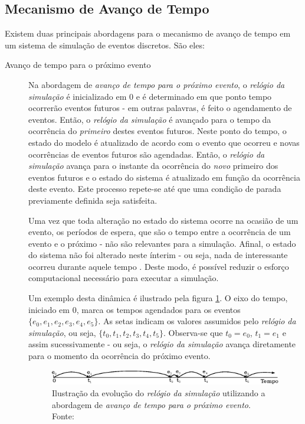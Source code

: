 \subsection{\label{chap:sim:timeadvance}Mecanismo de Avanço de Tempo}

Existem duas principais abordagens para o mecanismo de avanço de tempo em um sistema de simulação de eventos discretos. São eles:

\begin{description}
\item[Avanço de tempo para o próximo evento] \hfill

Na abordagem de \textit{avanço de tempo para o próximo evento}, o
\textit{relógio da simulação} é inicializado em 0 e é determinado em que ponto
tempo ocorrerão eventos futuros - em outras palavras, é feito o agendamento de
eventos. Então, o \textit{relógio da simulação} é avançado para o tempo da
ocorrência do \textit{primeiro} destes eventos futuros. Neste ponto do tempo, o
estado do modelo é atualizado de acordo com o evento que ocorreu e novas
ocorrências de eventos futuros são agendadas. Então, o \textit{relógio da
simulação} avança para o instante da ocorrência do \textit{novo} primeiro dos
eventos futuros e o estado do sistema é atualizado em função da ocorrência deste
evento. Este processo repete-se até que uma condição de parada previamente
definida seja satisfeita.

Uma vez que toda alteração no estado do sistema ocorre na ocasião de um evento,
os períodos de espera, que são o tempo entre a ocorrência de um evento e o
próximo - não são relevantes para a simulação. Afinal, o estado do sistema não
foi alterado neste ínterim - ou seja, nada de interessante ocorreu durante
aquele tempo \cite{Sim}. Deste modo, é possível reduzir o esforço computacional
necessário para executar a simulação.

Um exemplo desta dinâmica é ilustrado pela figura \ref{fig:nextevent}. O eixo do
tempo, iniciado em 0, marca os tempos agendados para os eventos $\{e_{0}, e_{1},
e_{2}, e_{3}, e_{4}, e_{5}\}$. As setas indicam os valores assumidos pelo
\textit{relógio da simulação}, ou seja, $\{t_{0}, t_{1}, t_{2}, t_{3}, t_{4},
t_{5}\}$. Observa-se que $t_{0} = e_{0}$, $t_{1} = e_{1}$ e assim sucessivamente
- ou seja, o \textit{relógio da simulação} avança diretamente para o momento
da ocorrência do próximo evento.

\begin{figure}[htb!]
\centering\includegraphics{img/nextevent.eps}
\caption{\label{fig:nextevent}Ilustração da evolução do \textit{relógio da simulação} utilizando a abordagem de \textit{avanço de tempo para o próximo evento}. Fonte:~\cite{Law}}
\end{figure}


\end{description}
